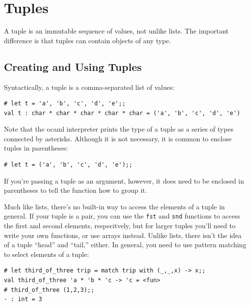 \documentclass[10pt]{book}
\begin{document}
{\begin{ex}
\end{ex}



\chapter{Tuples}
\label{tuplechap}




A tuple is an immutable sequence of values, not unlike lists. The important difference is that tuples can contain objects of any type.

\section{Creating and Using Tuples}

Syntactically, a tuple is a comma-separated list of values:

\beforeverb
\begin{verbatim}
# let t = 'a', 'b', 'c', 'd', 'e';;
val t : char * char * char * char * char = ('a', 'b', 'c', 'd', 'e')
\end{verbatim}
\afterverb
%
Note that the ocaml interpreter prints the type of a tuple as a series of types connected by asterisks. Although it is not necessary, it is common to enclose tuples in
parentheses:


\beforeverb
\begin{verbatim}
# let t = ('a', 'b', 'c', 'd', 'e');;
\end{verbatim}
\afterverb
%
If you're passing a tuple as an argument, however, it does need to be enclosed in parentheses to tell the function how to group it.

Much like lists, there's no built-in way to access the elements of a tuple in general. If your tuple is a pair, you can use the {\tt fst} and {\tt snd} functions to access the first and second elements, respecitvely, but for larger tuples you'll need to write your own functions, or use arrays instead. Unlike lists, there isn't the idea of a tuple ``head'' and ``tail,'' either. In general, you need to use pattern matching to select elements of a tuple:

\beforeverb
\begin{verbatim}
# let third_of_three trip = match trip with (_,_,x) -> x;;
val third_of_three 'a * 'b * 'c -> 'c = <fun>
# third_of_three (1,2,3);;
- : int = 3
\end{verbatim}
\afterverb

}
\end{document}
